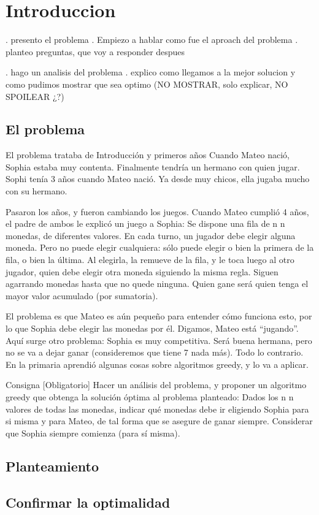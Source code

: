 \section{Introduccion}
. presento el problema
. Empiezo a hablar como fue el aproach del problema
. planteo preguntas, que voy a responder despues

. hago un analisis del problema
. explico como llegamos a la mejor solucion y como pudimos mostrar que sea optimo (NO MOSTRAR, solo explicar, NO SPOILEAR ¿?)

\subsection{El problema}



El problema trataba de
Introducción y primeros años
Cuando Mateo nació, Sophia estaba muy contenta. Finalmente tendría un hermano con quien jugar. Sophi tenía 3 años cuando Mateo nació. Ya desde muy chicos, ella jugaba mucho con su hermano.

Pasaron los años, y fueron cambiando los juegos. Cuando Mateo cumplió 4 años, el padre de ambos le explicó un juego a Sophia: Se dispone una fila de 
n
n monedas, de diferentes valores. En cada turno, un jugador debe elegir alguna moneda. Pero no puede elegir cualquiera: sólo puede elegir o bien la primera de la fila, o bien la última. Al elegirla, la remueve de la fila, y le toca luego al otro jugador, quien debe elegir otra moneda siguiendo la misma regla. Siguen agarrando monedas hasta que no quede ninguna. Quien gane será quien tenga el mayor valor acumulado (por sumatoria).

El problema es que Mateo es aún pequeño para entender cómo funciona esto, por lo que Sophia debe elegir las monedas por él. Digamos, Mateo está “jugando”. Aquí surge otro problema: Sophia es muy competitiva. Será buena hermana, pero no se va a dejar ganar (consideremos que tiene 7 nada más). Todo lo contrario. En la primaria aprendió algunas cosas sobre algoritmos greedy, y lo va a aplicar.

Consigna
[Obligatorio] Hacer un análisis del problema, y proponer un algoritmo greedy que obtenga la solución óptima al problema planteado: Dados los 
n
n valores de todas las monedas, indicar qué monedas debe ir eligiendo Sophia para si misma y para Mateo, de tal forma que se asegure de ganar siempre. Considerar que Sophia siempre comienza (para sí misma).

\subsection{Planteamiento}

\subsection{Confirmar la optimalidad}